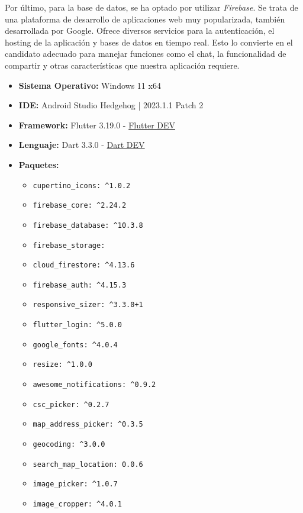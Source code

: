 \documentclass[a4paper, 12pt]{article}
\begin{document}
Por último, para la base de datos, se ha optado por utilizar \textit{Firebase}. Se trata de una plataforma de desarrollo de aplicaciones web muy popularizada, también desarrollada por Google. Ofrece diversos servicios para la autenticación, el hosting de la aplicación y bases de datos en tiempo real. Esto lo convierte en el candidato adecuado para manejar funciones como el chat, la funcionalidad de compartir y otras características que nuestra aplicación requiere.

\begin{itemize}[noitemsep]
	\item \textbf{Sistema Operativo:} Windows 11 x64
	\item \textbf{IDE:} Android Studio Hedgehog | 2023.1.1 Patch 2
	\item \textbf{Framework:} Flutter 3.19.0 -  \href{https://flutter.dev/6}{Flutter DEV} \cite{flutter_dev}
	\item \textbf{Lenguaje:} Dart 3.3.0 - \href{https://dart.dev/}{Dart DEV} \cite{dart_dev}
	\item \textbf{Paquetes:}
		\begin{itemize}[noitemsep]
		  \item \texttt{cupertino\_icons: \^{}1.0.2}
		  \item \texttt{firebase\_core: \^{}2.24.2}
		  \item \texttt{firebase\_database: \^{}10.3.8}
		  \item \texttt{firebase\_storage:}
		  \item \texttt{cloud\_firestore: \^{}4.13.6}
		  \item \texttt{firebase\_auth: \^{}4.15.3}
		  \item \texttt{responsive\_sizer: \^{}3.3.0+1}
		  \item \texttt{flutter\_login: \^{}5.0.0}
		  \item \texttt{google\_fonts: \^{}4.0.4}
		  \item \texttt{resize: \^{}1.0.0}
		  \item \texttt{awesome\_notifications: \^{}0.9.2}
		  \item \texttt{csc\_picker: \^{}0.2.7}
		  \item \texttt{map\_address\_picker: \^{}0.3.5}
		  \item \texttt{geocoding: \^{}3.0.0}
		  \item \texttt{search\_map\_location: 0.0.6}
		  \item \texttt{image\_picker: \^{}1.0.7}
		  \item \texttt{image\_cropper: \^{}4.0.1}

\end{itemize}
\end{itemize}
\end{document}
